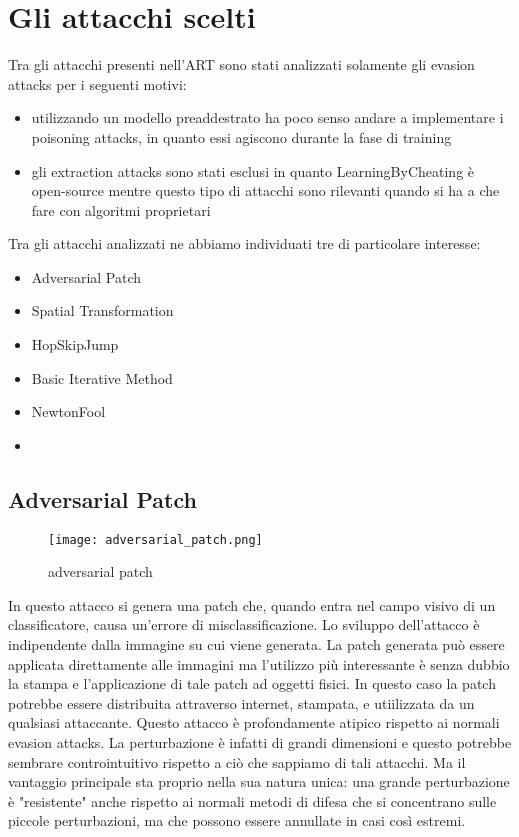 \section{Gli attacchi scelti}
Tra gli attacchi presenti nell'ART sono stati analizzati solamente gli evasion attacks per i seguenti motivi:\begin{itemize}
    \item utilizzando un modello preaddestrato ha poco senso andare a implementare i poisoning attacks, in quanto essi agiscono durante la fase di training
    \item gli extraction attacks sono stati esclusi in quanto LearningByCheating è open-source mentre questo tipo di attacchi sono rilevanti quando si ha a che fare
    con algoritmi proprietari
\end{itemize}
Tra gli attacchi analizzati ne abbiamo individuati tre di particolare interesse:\begin{itemize}
    \item Adversarial Patch
    \item Spatial Transformation
    \item HopSkipJump
    \item Basic Iterative Method
    \item NewtonFool
    \item 
\end{itemize}
\subsection{Adversarial Patch} 
\begin{figure}[h]
    \texttt{[image: adversarial\_patch.png]}
    \caption{adversarial patch}
    \label{fig:patch}
\end{figure}
\cite{patch} In questo attacco si genera una patch che, quando entra nel campo visivo di un classificatore, causa un'errore di misclassificazione. Lo sviluppo dell'attacco è 
indipendente dalla immagine su cui viene generata. La patch generata può essere applicata direttamente alle immagini ma l'utilizzo più interessante è senza dubbio la stampa e l'applicazione di tale patch
ad oggetti fisici. In questo caso la patch potrebbe essere distribuita attraverso internet, stampata, e utiilizzata da un qualsiasi attaccante. Questo attacco è profondamente atipico rispetto
ai normali evasion attacks. La perturbazione è infatti di grandi dimensioni e questo potrebbe sembrare controintuitivo rispetto a ciò che sappiamo di tali attacchi. Ma il vantaggio principale
sta proprio nella sua natura unica: una grande perturbazione è "resistente" anche rispetto ai normali metodi di difesa che si concentrano sulle piccole perturbazioni, ma che possono essere annullate in 
casi così estremi.
